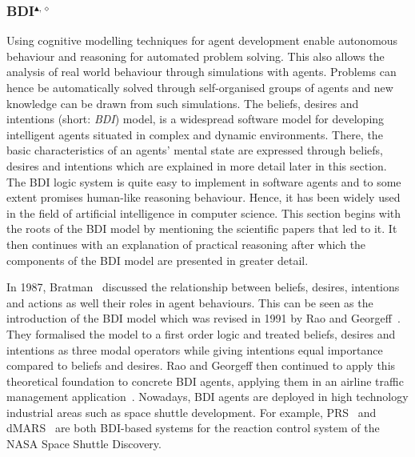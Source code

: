 \subsubsection[BDI]{BDI$^{\blacktriangle,\diamond}$}\label{fun:BDI}
Using cognitive modelling techniques for agent development enable autonomous behaviour and reasoning for automated problem solving.
This also allows the analysis of real world behaviour through simulations with agents.
Problems can hence be automatically solved through self-organised groups of agents and new knowledge can be drawn from such simulations.
The beliefs, desires and intentions (short: \emph{BDI}) model, is a widespread software model for developing intelligent agents situated in complex and dynamic environments.
There, the basic characteristics of an agents' mental state are expressed through beliefs, desires and intentions which are explained in more detail later in this section.
The BDI logic system is quite easy to implement in software agents and to some extent promises human-like reasoning behaviour.
Hence, it has been widely used in the field of artificial intelligence in computer science.
This section begins with the roots of the BDI model by mentioning the scientific papers that led to it.
It then continues with an explanation of practical reasoning after which the components of the BDI model are presented in greater detail.

In 1987, Bratman~\cite{MICHAEL_PlansResource_1988} discussed the relationship between beliefs, desires, intentions and actions as well their roles in agent behaviours.
This can be seen as the introduction of the BDI model which was revised in 1991 by Rao and Georgeff~\cite{rao_modeling_1991}.
They formalised the model to a first order logic and treated beliefs, desires and intentions as three modal operators while giving intentions equal importance compared to beliefs and desires.
Rao and Georgeff then continued to apply this theoretical foundation to concrete BDI agents, applying them in an airline traffic management application~\cite{Rao_BDITheory_1995}.
Nowadays, BDI agents are deployed in high technology industrial areas such as space shuttle development.
For example, PRS~\cite{Ingrand_PRS_1992} and dMARS~\cite{Mark_dMARS_2004} are both BDI-based systems for the reaction control system of the NASA Space Shuttle Discovery.

